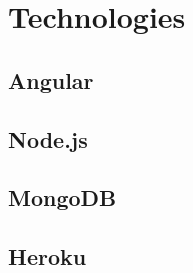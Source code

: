 \chapter{Technologies}
\label{chap:Tech}

\section{Angular}


\section{Node.js}


\section{MongoDB}


\section{Heroku}


